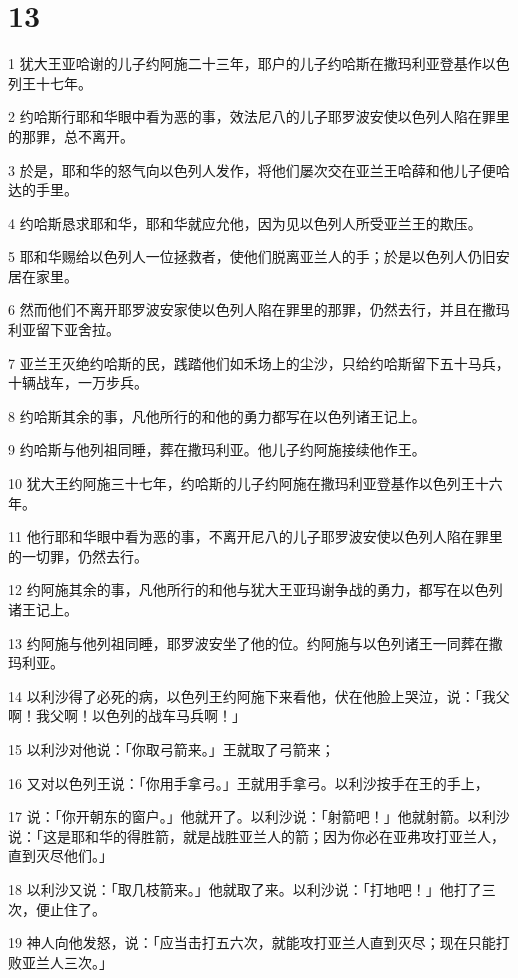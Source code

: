 \chapter{13}

\par 1 犹大王亚哈谢的儿子约阿施二十三年，耶户的儿子约哈斯在撒玛利亚登基作以色列王十七年。
\par 2 约哈斯行耶和华眼中看为恶的事，效法尼八的儿子耶罗波安使以色列人陷在罪里的那罪，总不离开。
\par 3 於是，耶和华的怒气向以色列人发作，将他们屡次交在亚兰王哈薛和他儿子便哈达的手里。
\par 4 约哈斯恳求耶和华，耶和华就应允他，因为见以色列人所受亚兰王的欺压。
\par 5 耶和华赐给以色列人一位拯救者，使他们脱离亚兰人的手；於是以色列人仍旧安居在家里。
\par 6 然而他们不离开耶罗波安家使以色列人陷在罪里的那罪，仍然去行，并且在撒玛利亚留下亚舍拉。
\par 7 亚兰王灭绝约哈斯的民，践踏他们如禾场上的尘沙，只给约哈斯留下五十马兵，十辆战车，一万步兵。
\par 8 约哈斯其余的事，凡他所行的和他的勇力都写在以色列诸王记上。
\par 9 约哈斯与他列祖同睡，葬在撒玛利亚。他儿子约阿施接续他作王。
\par 10 犹大王约阿施三十七年，约哈斯的儿子约阿施在撒玛利亚登基作以色列王十六年。
\par 11 他行耶和华眼中看为恶的事，不离开尼八的儿子耶罗波安使以色列人陷在罪里的一切罪，仍然去行。
\par 12 约阿施其余的事，凡他所行的和他与犹大王亚玛谢争战的勇力，都写在以色列诸王记上。
\par 13 约阿施与他列祖同睡，耶罗波安坐了他的位。约阿施与以色列诸王一同葬在撒玛利亚。
\par 14 以利沙得了必死的病，以色列王约阿施下来看他，伏在他脸上哭泣，说：「我父啊！我父啊！以色列的战车马兵啊！」
\par 15 以利沙对他说：「你取弓箭来。」王就取了弓箭来；
\par 16 又对以色列王说：「你用手拿弓。」王就用手拿弓。以利沙按手在王的手上，
\par 17 说：「你开朝东的窗户。」他就开了。以利沙说：「射箭吧！」他就射箭。以利沙说：「这是耶和华的得胜箭，就是战胜亚兰人的箭；因为你必在亚弗攻打亚兰人，直到灭尽他们。」
\par 18 以利沙又说：「取几枝箭来。」他就取了来。以利沙说：「打地吧！」他打了三次，便止住了。
\par 19 神人向他发怒，说：「应当击打五六次，就能攻打亚兰人直到灭尽；现在只能打败亚兰人三次。」
